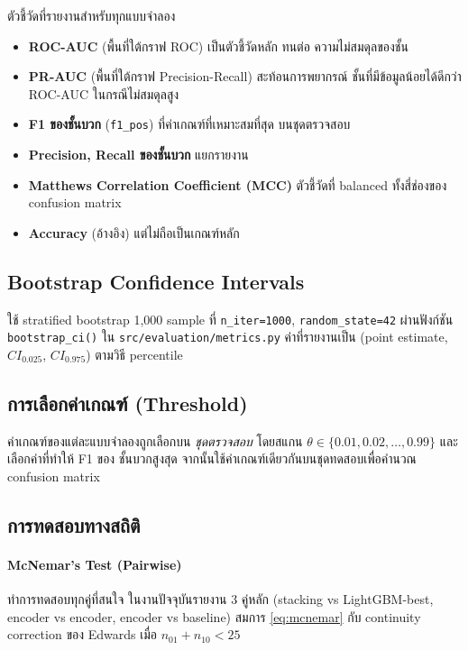 ตัวชี้วัดที่รายงานสำหรับทุกแบบจำลอง

\begin{itemize}[leftmargin=2em]
  \item \textbf{ROC-AUC} (พื้นที่ใต้กราฟ ROC) เป็นตัวชี้วัดหลัก ทนต่อ
        ความไม่สมดุลของชั้น
  \item \textbf{PR-AUC} (พื้นที่ใต้กราฟ Precision-Recall) สะท้อนการพยากรณ์
        ชั้นที่มีข้อมูลน้อยได้ดีกว่า ROC-AUC ในกรณีไม่สมดุลสูง
  \item \textbf{F1 ของชั้นบวก} (\texttt{f1\_pos}) ที่ค่าเกณฑ์ที่เหมาะสมที่สุด
        บนชุดตรวจสอบ
  \item \textbf{Precision, Recall ของชั้นบวก} แยกรายงาน
  \item \textbf{Matthews Correlation Coefficient (MCC)} ตัวชี้วัดที่
        balanced ทั้งสี่ช่องของ confusion matrix
  \item \textbf{Accuracy} (อ้างอิง) แต่ไม่ถือเป็นเกณฑ์หลัก
\end{itemize}

\subsection{Bootstrap Confidence Intervals}

ใช้ stratified bootstrap 1{,}000 sample ที่ \texttt{n\_iter=1000},
\texttt{random\_state=42} ผ่านฟังก์ชัน \texttt{bootstrap\_ci()} ใน
\texttt{src/evaluation/metrics.py} ค่าที่รายงานเป็น (point estimate, $CI_{0.025}$,
$CI_{0.975}$) ตามวิธี percentile

\subsection{การเลือกค่าเกณฑ์ (Threshold)}

ค่าเกณฑ์ของแต่ละแบบจำลองถูกเลือกบน \emph{ชุดตรวจสอบ} โดยสแกน
$\theta \in \{0.01, 0.02, \ldots, 0.99\}$ และเลือกค่าที่ทำให้ F1 ของ
ชั้นบวกสูงสุด จากนั้นใช้ค่าเกณฑ์เดียวกันบนชุดทดสอบเพื่อคำนวณ confusion matrix

\subsection{การทดสอบทางสถิติ}

\paragraph{McNemar's Test (Pairwise)}
ทำการทดสอบทุกคู่ที่สนใจ ในงานปัจจุบันรายงาน 3 คู่หลัก
(stacking vs LightGBM-best, encoder vs encoder, encoder vs baseline) สมการ
\eqref{eq:mcnemar} กับ continuity correction ของ Edwards เมื่อ $n_{01} + n_{10} < 25$

